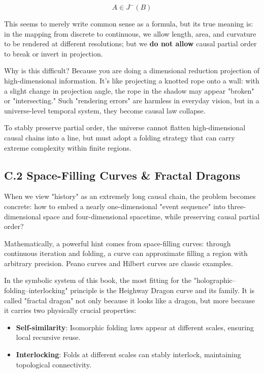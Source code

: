 $$A \in J^{-}(B)$$

This seems to merely write common sense as a formula, but its true meaning is: in the mapping from discrete to continuous, we allow length, area, and curvature to be rendered at different resolutions; but we \textbf{do not allow} causal partial order to break or invert in projection.

Why is this difficult? Because you are doing a dimensional reduction projection of high-dimensional information. It's like projecting a knotted rope onto a wall: with a slight change in projection angle, the rope in the shadow may appear "broken" or "intersecting." Such "rendering errors" are harmless in everyday vision, but in a universe-level temporal system, they become causal law collapse.

To stably preserve partial order, the universe cannot flatten high-dimensional causal chains into a line, but must adopt a folding strategy that can carry extreme complexity within finite regions.

\subsection*{C.2 Space-Filling Curves \& Fractal Dragons}

When we view "history" as an extremely long causal chain, the problem becomes concrete: how to embed a nearly one-dimensional "event sequence" into three-dimensional space and four-dimensional spacetime, while preserving causal partial order?

Mathematically, a powerful hint comes from space-filling curves: through continuous iteration and folding, a curve can approximate filling a region with arbitrary precision. Peano curves and Hilbert curves are classic examples.

In the symbolic system of this book, the most fitting for the "holographic--folding--interlocking" principle is the Heighway Dragon curve and its family. It is called "fractal dragon" not only because it looks like a dragon, but more because it carries two physically crucial properties:

\begin{itemize}
\item \textbf{Self-similarity}: Isomorphic folding laws appear at different scales, ensuring local recursive reuse.
\item \textbf{Interlocking}: Folds at different scales can stably interlock, maintaining topological connectivity.
\end{itemize}

